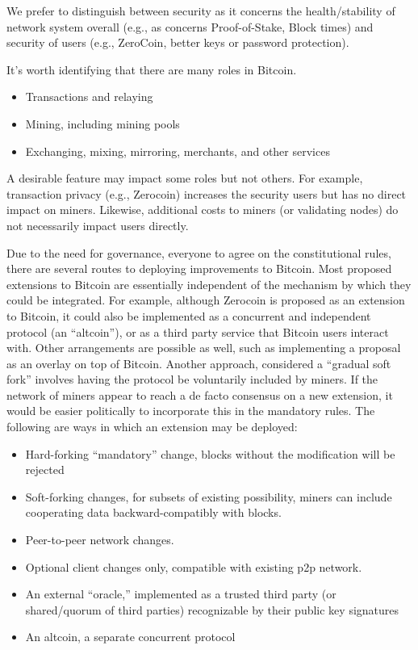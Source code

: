 We prefer to distinguish between security as it concerns the health/stability of network system overall (e.g., as concerns Proof-of-Stake, Block times) and security of users (e.g., ZeroCoin, better keys or password protection).

It's worth identifying that there are many roles in Bitcoin.
\begin{itemize}
\item Transactions and relaying
\item Mining, including mining pools
\item Exchanging, mixing, mirroring, merchants, and other services
\end{itemize}
A desirable feature may impact some roles but not others. For example, transaction privacy (e.g., Zerocoin) increases the security users but has no direct impact on miners. Likewise, additional costs to miners (or validating nodes) do not necessarily impact users directly.

Due to the need for governance, everyone to agree on the constitutional rules, there are several routes to deploying improvements to Bitcoin. Most proposed extensions to Bitcoin are essentially independent of the mechanism by which they could be integrated. For example, although Zerocoin is proposed as an extension to Bitcoin, it could also be implemented as a concurrent and independent protocol (an ``altcoin''), or as a third party service that Bitcoin users interact with. Other arrangements are possible as well, such as implementing a proposal as an overlay on top of Bitcoin. Another approach, considered a ``gradual soft fork'' involves having the protocol be voluntarily included by miners. If the network of miners appear to reach a de facto consensus on a new extension, it would be easier politically to incorporate this in the mandatory rules. The following are ways in which an extension may be deployed:

\begin{itemize}
\item Hard-forking ``mandatory'' change, blocks without the modification will be rejected
\item Soft-forking changes, for subsets of existing possibility, miners can include cooperating data backward-compatibly with blocks.
\item Peer-to-peer network changes.
\item Optional client changes only, compatible with existing p2p network.
\item An external ``oracle,'' implemented as a trusted third party (or shared/quorum of third parties) recognizable by their public key signatures
\item An altcoin, a separate concurrent protocol
\end{itemize}

